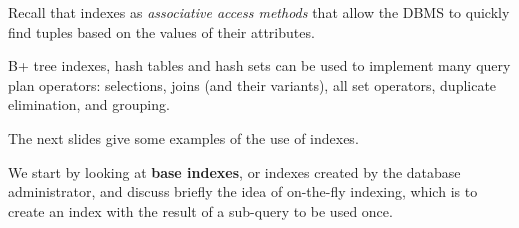 

\begin{frame}

Recall that indexes as \emph{associative access methods} that allow the DBMS to quickly find tuples based on the values of their attributes.

B+ tree indexes, hash tables and hash sets can be used to implement many query plan operators: selections, joins (and their variants), all set operators, duplicate elimination, and grouping.

The next slides give some examples of the use of indexes.

We start by looking at \textbf{base indexes}, or indexes created by the database administrator, and discuss briefly the idea of on-the-fly indexing, which is to create an index with the result of a sub-query to be used once.

\end{frame}


%
%

